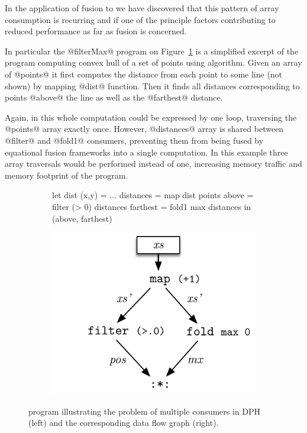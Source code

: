 \documentclass[preamble.tex]{subfiles}
\begin{document}
In the application of fusion to \DPH\idph we have discovered that this pattern of array consumption is recurring and if one of the principle factors contributing to reduced performance as far as fusion is concerned.

In particular the @filterMax@ program on Figure~\ref{fig:filterMax} is a simplified excerpt of the \DPH program computing convex hull of a set of points using \QuickHull\iqh algorithm. Given an array of @points@ it first computes the distance from each point to some line (not shown) by mapping @dist@ function. Then it finds all distances corresponding to points @above@ the line as well as the @farthest@ distance.

Again, in \C this whole computation could be expressed by one loop, traversing the @points@ array exactly once. However, @distances@ array is shared between @filter@ and @fold1@ consumers, preventing them from being fused by equational fusion frameworks into a single computation. In this example three array traversals would be performed instead of one, increasing memory traffic and memory footprint of the program.


\begin{figure}

\begin{subfigure}{.6\textwidth}%
\begin{hscode}
let dist (x,y) = ...
    distances  = map dist points
    above      = filter (> 0) distances
    farthest   = fold1 max distances
in  (above, farthest)
\end{hscode}
\end{subfigure}%
%
\begin{subfigure}{.4\textwidth}%
\includegraphics[center,scale=0.85]{img/DFD-Flat-FilterMax}%
\end{subfigure}%

\caption{ program illustrating the problem of multiple consumers in DPH (left) and the corresponding data flow graph (right).}
\label{fig:filterMax}
\end{figure}
\end{document}
